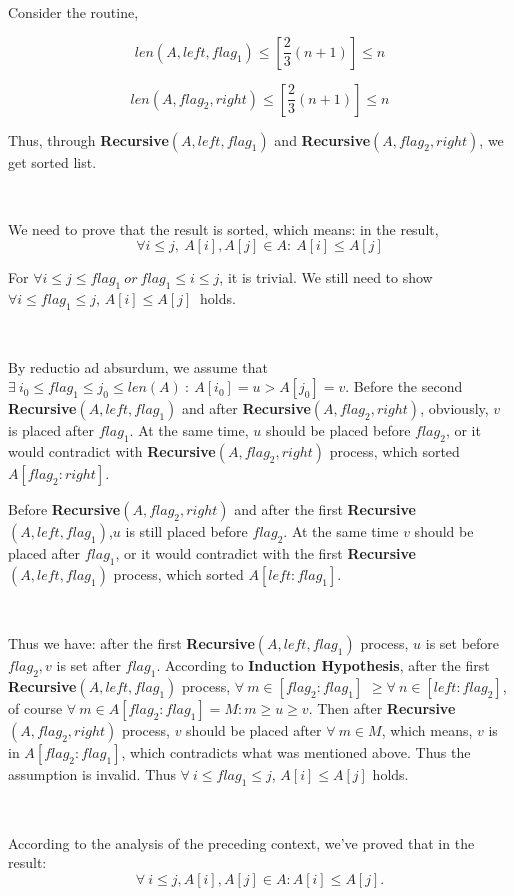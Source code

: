 \documentclass[11pt]{article}
\begin{document}
\begin{enumerate}
\begin{enumerate}
	Consider the routine,
	
	$$len(A,left,flag_1)\leq [\frac{2}{3}(n+1)] \leq n$$
	
	$$len(A,flag_2,right) \leq [\frac{2}{3}(n+1)] \leq n$$ 
	
	Thus, through \textbf{Recursive}$(A,left,flag_1)$ and \textbf{Recursive}$(A,flag_2,right)$, we get sorted list. 
	
	\
	
	We need to prove that the result is sorted, which means: in the result,
	$$
	 {\forall} i \leq j, \ A[i],A[j] \in A:\ A[i] \leq A[j]
	$$
	
	 For ${\forall}i \leq j \leq flag_1 \ or \ flag_1 \leq i \leq j$, it is trivial. We still need to show  $ {\forall} i \leq flag_1 \leq j$, $A[i] \leq A[j]\ $ holds.
	
	\
	
	By  reductio ad absurdum, we assume that  $ {\exists}\ i_0 \leq flag_1 \leq j_0 \leq len(A) \ : \ A[i_0]=u > A[j_0]=v$. Before the second \textbf{Recursive}$(A,left,flag_1)$ and after \textbf{Recursive}$(A,flag_2,right)$, obviously,  $v$ is placed after $flag_1$. At the same time, $u$ should be placed before $flag_2$, or it would contradict with \textbf{Recursive}$(A,flag_2,right)$ process, which sorted $A[flag_2:right]$. 
	\
	
	Before \textbf{Recursive}$(A,flag_2,right)$ and after the first \textbf{Recursive}$(A,left,flag_1)$,$u$ is still placed before $flag_2$. At the same time $v$ should be placed after $flag_1$, or it would contradict with the first \textbf{Recursive}$(A,left,flag_1)$ process, which sorted $A[left:flag_1]$. 
	
	\
	
	Thus we have: after the first \textbf{Recursive}$(A,left,flag_1)$ process, $u$ is set before $flag_2, v$ is set after $flag_1$. According to \textbf{Induction Hypothesis}, after the first \textbf{Recursive}$(A,left,flag_1)$ process, $ {\forall} \ m \in [flag_2:flag_1]$ $\geq {\forall} \ n \in [left:flag_2]$, of course ${\forall} \ m \in A[flag_2:flag_1]=M: m \geq u \geq v$. Then after \textbf{Recursive}$(A,flag_2,right)$ process, $v$ should be placed after $ {\forall} \ m \in M$, which means, $v$ is in $A[flag_2:flag_1]$, which contradicts what was mentioned above. Thus the assumption is invalid. Thus $ {\forall} \ i \leq flag_1 \leq j$, $A[i] \leq A[j]$ holds.

	\
	
	According to the analysis of the preceding context, we've proved that in the result:  
	$${\forall}\ i \leq j, A[i],A[j] \in A : A[i] \leq A[j].$$
	

\end{enumerate}
\end{enumerate}
\end{document}
